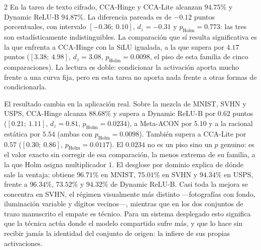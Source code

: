 \begin{multicols}{2}
En la tarea de texto cifrado, CCA-Hinge y CCA-Lite alcanzan $94.75\%$ y Dynamic ReLU-B $94.87\%$. La diferencia pareada es de $-0.12$ puntos porcentuales, con intervalo $[-0.36;\ 0.10]$, $d_z=-0.31$ y $p_{\mathrm{Holm}}=0.773$: las tres son estadísticamente indistinguibles. La comparación que sí resulta significativa es la que enfrenta a CCA-Hinge con la SiLU igualada, a la que supera por $4.17$ puntos ($[3.38;\ 4.98]$, $d_z=3.08$, $p_{\mathrm{Holm}}=0.0098$, el piso de esta familia de cinco comparaciones). La lectura es doble: condicionar la activación aporta mucho frente a una curva fija, pero en esta tarea no aporta nada frente a otras formas de condicionarla.

El resultado cambia en la aplicación real. Sobre la mezcla de MNIST, SVHN y USPS, CCA-Hinge alcanza $88.68\%$ y supera a Dynamic ReLU-B por $0.62$ puntos ($[0.21;\ 1.11]$, $d_z=0.81$, $p_{\mathrm{Holm}}=0.0234$), a Meta-ACON por $5.10$ y a la racional estática por $5.54$ (ambas con $p_{\mathrm{Holm}}=0.0098$). También supera a CCA-Lite por $0.57$ ($[0.30;\ 0.86]$, $p_{\mathrm{Holm}}=0.0117$). El $0.0234$ no es un piso sino un $p$ genuino: es el valor exacto sin corregir de esa comparación, la menos extrema de su familia, a la que Holm asigna multiplicador $1$. El desglose por dominio explica de dónde sale la ventaja: obtiene $96.71\%$ en MNIST, $75.01\%$ en SVHN y $94.34\%$ en USPS, frente a $96.34\%$, $73.52\%$ y $94.32\%$ de Dynamic ReLU-B. Casi toda la mejora se concentra en SVHN, el régimen visualmente más distinto —fotografías con fondo, iluminación variable y dígitos vecinos—, mientras que en los dos conjuntos de trazo manuscrito el empate es técnico. Para un sistema desplegado esto significa que la técnica actúa donde el modelo compartido sufre más, y que lo hace sin recibir jamás la identidad del conjunto de origen: la infiere de sus propias activaciones.


\end{multicols}
